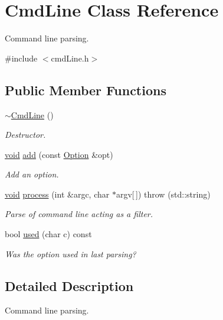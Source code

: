 \hypertarget{classCmdLine}{}\section{Cmd\+Line Class Reference}
\label{classCmdLine}


Command line parsing.  




{\ttfamily \#include $<$cmd\+Line.\+h$>$}

\subsection*{Public Member Functions}
\begin{DoxyCompactItemize}
\item 
\hyperlink{classCmdLine_adacf99c4b9d37b19c6d7b955f23c073a}{$\sim$\+Cmd\+Line} ()
\begin{DoxyCompactList}\small\item\em Destructor. \end{DoxyCompactList}\item 
\hyperlink{png_8h_aa8c59027f9ab2769342f248709d68d17}{void} \hyperlink{classCmdLine_ad6093d65056d86bf3a0fecd45329f7de}{add} (const \hyperlink{classOption}{Option} \&opt)
\begin{DoxyCompactList}\small\item\em Add an option. \end{DoxyCompactList}\item 
\hyperlink{png_8h_aa8c59027f9ab2769342f248709d68d17}{void} \hyperlink{classCmdLine_a777bc2f665289af03cfb37908421c4c0}{process} (int \&argc, char $\ast$argv\mbox{[}$\,$\mbox{]})  throw (std\+::string)
\begin{DoxyCompactList}\small\item\em Parse of command line acting as a filter. \end{DoxyCompactList}\item 
bool \hyperlink{classCmdLine_aeb6e864bf140dfc764e89df0cbd6585f}{used} (char c) const 
\begin{DoxyCompactList}\small\item\em Was the option used in last parsing? \end{DoxyCompactList}\end{DoxyCompactItemize}


\subsection{Detailed Description}
Command line parsing. 

